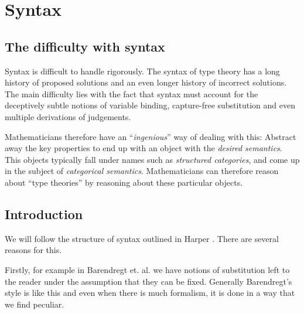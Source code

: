 
\section{Syntax}

\subsection{The difficulty with syntax}
Syntax is difficult to handle rigorously. The syntax of type theory has a long history of proposed solutions and an even longer history of incorrect solutions. The main difficulty lies with the fact that syntax must account for the deceptively subtle notions of variable binding, capture-free substitution and even multiple derivations of judgements.

Mathematicians therefore have an ``\emph{ingenious}'' way of dealing with this: Abstract away the key properties to end up with an object with the \emph{desired semantics}. This objects typically fall under names such as \emph{structured categories}, and come up in the subject of \emph{categorical semantics}. Mathematicians can therefore reason about ``type theories'' by reasoning about these particular objects.


\subsection{Introduction}





We will follow the structure of syntax outlined in Harper \cite{harper_2016}. There are several reasons for this. 

Firstly, for example in Barendregt et. al. \cite{BarendregtHenk2013Lcwt} we have notions of substitution left to the reader under the assumption that they can be fixed. Generally Barendregt's style is like this and even when there is much formalism, it is done in a way that we find peculiar.

